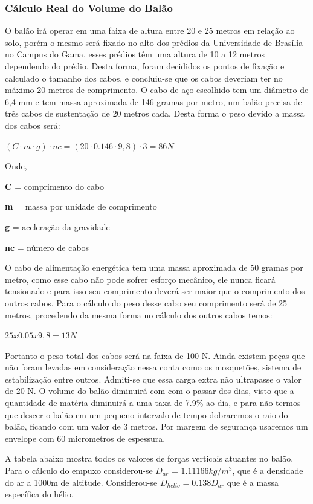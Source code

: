 \subsubsection{Cálculo Real do Volume do Balão}

 O  balão irá operar em uma faixa de altura entre 20 e 25 metros em relação ao solo, porém  o mesmo será fixado no alto dos prédios da Universidade de Brasília no Campus do Gama, esses prédios têm uma altura de 10 a 12 metros dependendo do prédio. Desta forma, foram decididos os pontos de fixação e calculado o tamanho dos cabos, e concluiu-se que os cabos deveriam ter no máximo 20 metros de comprimento.
O cabo de aço escolhido tem um diâmetro de 6,4 mm e tem massa aproximada de 146 gramas por metro, um balão precisa de três cabos de sustentação de 20 metros cada. Desta forma o peso devido a massa dos cabos será:

$(C \cdot m \cdot g) \cdot nc = (20 \cdot 0.146 \cdot 9,8 ) \cdot 3 = 86 N$

Onde,

\textbf{C} = comprimento do cabo

\textbf{m} = massa por unidade de comprimento

\textbf{g} =  aceleração da gravidade

\textbf{nc} = número de cabos

O cabo de alimentação energética tem uma massa aproximada de 50 gramas por metro, como esse cabo não pode sofrer esforço mecânico, ele nunca  ficará tensionado e para isso seu comprimento deverá ser maior que o comprimento dos outros cabos. Para o cálculo do peso desse cabo seu comprimento será de 25 metros, procedendo da mesma forma no cálculo dos outros cabos temos:

$25 x 0.05x 9,8 = 13 N$

Portanto o peso total dos cabos será na faixa de 100 N.
Ainda existem peças que não foram levadas em consideração nessa conta como os mosquetões, sistema de estabilização entre outros. Admiti-se que essa carga extra não ultrapasse o valor de 20 N.
O volume do balão diminuirá com com o passar dos dias, visto que a quantidade de matéria diminuirá a uma taxa de 7.9\% ao dia, e para não termos que descer o balão em um pequeno intervalo de tempo dobraremos o raio do balão, ficando com um valor de 3 metros. Por margem de segurança usaremos um envelope com 60 micrometros de espessura.

A tabela abaixo mostra todos os valores de forças verticais atuantes no balão. Para o cálculo do empuxo considerou-se $D_{ar}$ = $1.11166 kg/m^3$, que é a densidade do ar a 1000m de altitude. Considerou-se $D_{helio} = 0.138 D_{ar}$ que é a massa específica do hélio.

